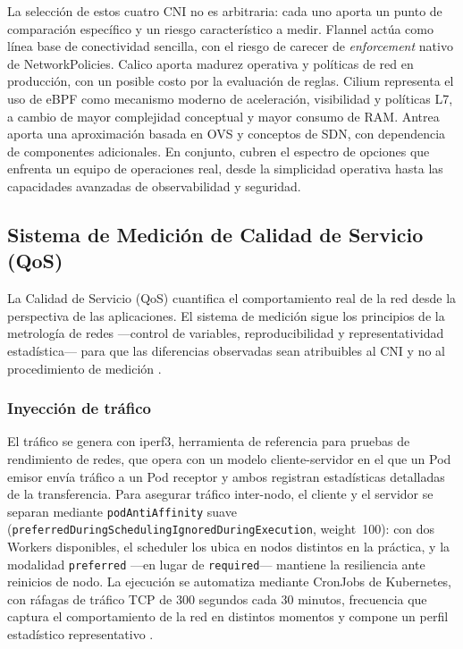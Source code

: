 La selección de estos cuatro CNI no es arbitraria: cada uno aporta un punto de comparación específico y un riesgo característico a medir. Flannel actúa como línea base de conectividad sencilla, con el riesgo de carecer de \emph{enforcement} nativo de NetworkPolicies. Calico aporta madurez operativa y políticas de red en producción, con un posible costo por la evaluación de reglas. Cilium representa el uso de eBPF como mecanismo moderno de aceleración, visibilidad y políticas L7, a cambio de mayor complejidad conceptual y mayor consumo de RAM. Antrea aporta una aproximación basada en OVS y conceptos de SDN, con dependencia de componentes adicionales. En conjunto, cubren el espectro de opciones que enfrenta un equipo de operaciones real, desde la simplicidad operativa hasta las capacidades avanzadas de observabilidad y seguridad.

\subsection{Sistema de Medición de Calidad de Servicio (QoS)}

La Calidad de Servicio (QoS) cuantifica el comportamiento real de la red desde la perspectiva de las aplicaciones. El sistema de medición sigue los principios de la metrología de redes ---control de variables, reproducibilidad y representatividad estadística--- para que las diferencias observadas sean atribuibles al CNI y no al procedimiento de medición \cite{ref6}.

\subsubsection{Inyección de tráfico}

El tráfico se genera con iperf3, herramienta de referencia para pruebas de rendimiento de redes, que opera con un modelo cliente-servidor en el que un Pod emisor envía tráfico a un Pod receptor y ambos registran estadísticas detalladas de la transferencia. Para asegurar tráfico inter-nodo, el cliente y el servidor se separan mediante \texttt{podAntiAffinity} suave (\texttt{preferredDuringSchedulingIgnoredDuringExecution}, weight~100): con dos Workers disponibles, el scheduler los ubica en nodos distintos en la práctica, y la modalidad \texttt{preferred} ---en lugar de \texttt{required}--- mantiene la resiliencia ante reinicios de nodo. La ejecución se automatiza mediante CronJobs de Kubernetes, con ráfagas de tráfico TCP de 300 segundos cada 30 minutos, frecuencia que captura el comportamiento de la red en distintos momentos y compone un perfil estadístico representativo \cite{ref7}.

